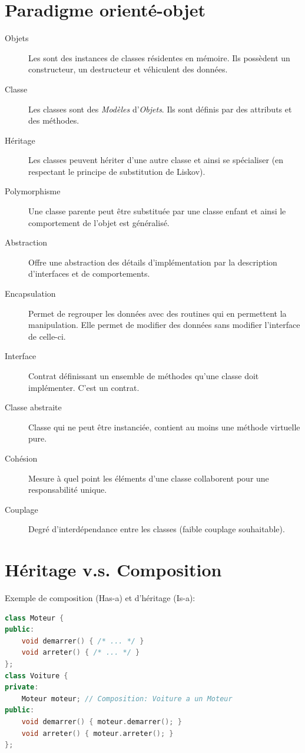 \documentclass[9pt]{extarticle}
\begin{document}
\begin{multicols*}{3}
\section*{Paradigme orienté-objet}
\begin{description}
\item[Objets] Les sont des instances de classes résidentes en mémoire. Ils possèdent un constructeur, un destructeur et véhiculent des données.
\item[Classe] Les classes sont des \emph{Modèles} d'\emph{Objets}. Ils sont définis par des attributs et des méthodes.
\item[Héritage] Les classes peuvent hériter d'une autre classe et ainsi se spécialiser (en respectant le principe de substitution de Liskov).
\item[Polymorphisme] Une classe parente peut être substituée par une classe enfant et ainsi le comportement de l'objet est généralisé.
\item[Abstraction] Offre une abstraction des détails d'implémentation par la description d'interfaces et de comportements.
\item[Encapsulation] Permet de regrouper les données avec des routines qui en permettent la manipulation. Elle permet de modifier des données sans modifier l'interface de celle-ci.
\item[Interface] Contrat définissant un ensemble de méthodes qu'une classe doit implémenter. C'est un contrat.
\item[Classe abstraite] Classe qui ne peut être instanciée, contient au moins une méthode virtuelle pure.
\item[Cohésion] Mesure à quel point les éléments d'une classe collaborent pour une responsabilité unique.
\item[Couplage] Degré d'interdépendance entre les classes (faible couplage souhaitable).
\end{description}

\section*{Héritage v.s. Composition}
Exemple de composition (Has-a) et d'héritage (Is-a):
\begin{lstlisting}[language=C++]
class Moteur {
public:
    void demarrer() { /* ... */ }
    void arreter() { /* ... */ }
};
class Voiture {
private:
    Moteur moteur; // Composition: Voiture a un Moteur
public:
    void demarrer() { moteur.demarrer(); }
    void arreter() { moteur.arreter(); }
};


\end{lstlisting}
\end{multicols*}
\end{document}
